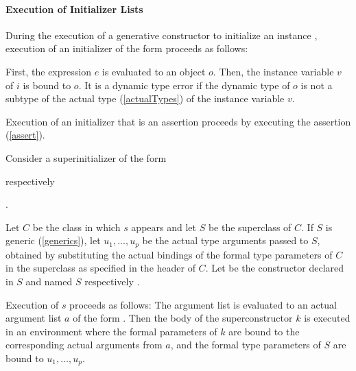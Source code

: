 \documentclass[makeidx]{article}
\begin{document}


\paragraph{Execution of Initializer Lists}

\LMHash{}%
During the execution of a generative constructor to initialize an instance
,
execution of an initializer of the form 
proceeds as follows:

\LMHash{}%
First, the expression $e$ is evaluated to an object $o$.
Then, the instance variable $v$ of $i$ is bound to $o$.
It is a dynamic type error if the dynamic type of $o$ is not
a subtype of the actual type
(\ref{actualTypes})
of the instance variable $v$.

\LMHash{}%
Execution of an initializer that is an assertion proceeds by
executing the assertion (\ref{assert}).

\LMHash{}%
Consider a superinitializer  of the form

\noindent
{}
respectively

\noindent
{}.

\LMHash{}%
%
Let $C$ be the class in which $s$ appears and let $S$ be the superclass of $C$.
If $S$ is generic (\ref{generics}),
let $u_1, \ldots, u_p$ be the actual type arguments passed to $S$,
obtained by substituting the actual bindings 
of the formal type parameters of $C$
in the superclass as specified in the header of $C$.
Let  be the constructor declared in $S$ and named
$S$ respectively .

\LMHash{}%
Execution of $s$ proceeds as follows:
The argument list
is evaluated to an actual argument list $a$ of the form
.
Then the body of the superconstructor $k$ is executed
in an environment where the formal parameters of $k$ are bound to
the corresponding actual arguments from $a$,
and the formal type parameters of $S$ are bound to $u_1, \ldots, u_p$.
\end{document}

